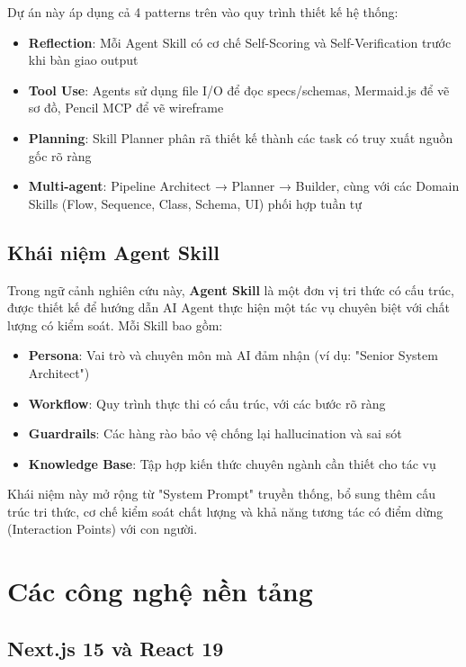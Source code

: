 \documentclass[13pt,a4paper,oneside]{extreport}
\numberwithin{equation}{chapter}
\numberwithin{figure}{chapter}
\numberwithin{table}{chapter}
\begin{document}
Dự án này áp dụng cả 4 patterns trên vào quy trình thiết kế hệ thống:

\begin{itemize}
    \item \textbf{Reflection}: Mỗi Agent Skill có cơ chế Self-Scoring và Self-Verification trước khi bàn giao output
    \item \textbf{Tool Use}: Agents sử dụng file I/O để đọc specs/schemas, Mermaid.js để vẽ sơ đồ, Pencil MCP để vẽ wireframe
    \item \textbf{Planning}: Skill Planner phân rã thiết kế thành các task có truy xuất nguồn gốc rõ ràng
    \item \textbf{Multi-agent}: Pipeline Architect → Planner → Builder, cùng với các Domain Skills (Flow, Sequence, Class, Schema, UI) phối hợp tuần tự
\end{itemize}

\subsection{Khái niệm Agent Skill}

Trong ngữ cảnh nghiên cứu này, \textbf{Agent Skill} là một đơn vị tri thức có cấu trúc, được thiết kế để hướng dẫn AI Agent thực hiện một tác vụ chuyên biệt với chất lượng có kiểm soát. Mỗi Skill bao gồm:

\begin{itemize}
    \item \textbf{Persona}: Vai trò và chuyên môn mà AI đảm nhận (ví dụ: "Senior System Architect")
    \item \textbf{Workflow}: Quy trình thực thi có cấu trúc, với các bước rõ ràng
    \item \textbf{Guardrails}: Các hàng rào bảo vệ chống lại hallucination và sai sót
    \item \textbf{Knowledge Base}: Tập hợp kiến thức chuyên ngành cần thiết cho tác vụ
\end{itemize}

Khái niệm này mở rộng từ "System Prompt" truyền thống, bổ sung thêm cấu trúc tri thức, cơ chế kiểm soát chất lượng và khả năng tương tác có điểm dừng (Interaction Points) với con người.

\section{Các công nghệ nền tảng}

\subsection{Next.js 15 và React 19}
\end{document}
